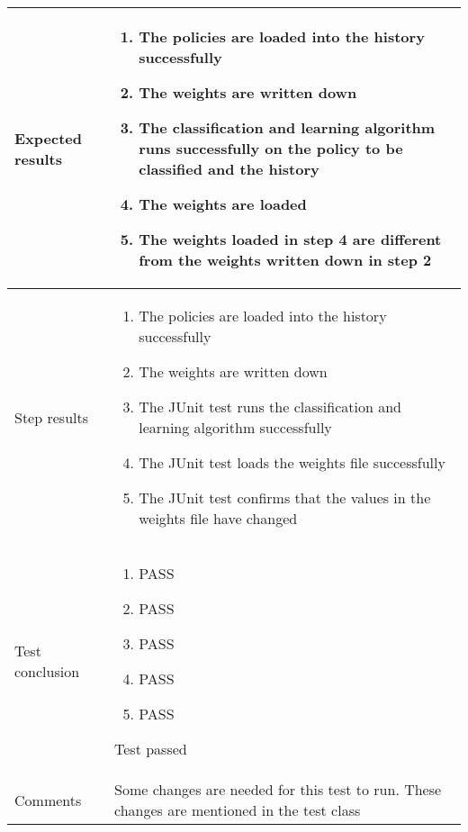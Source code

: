 \documentclass[10pt]{article}
\begin{document}
\begin{center}
\begin{longtable}{ | p{4cm} | p{10cm} | }
			Expected results &	\begin{enumerate}
							\item The policies are loaded into the history successfully
							\item The weights are written down
							\item The classification and learning algorithm runs successfully on the policy to be classified and the history
							\item The weights are loaded
							\item The weights loaded in step 4 are different from the weights written down in step 2
						\end{enumerate}
							 \\  [3pt] \hline

			Step results & 	\begin{enumerate}
							\item The policies are loaded into the history successfully
							\item The weights are written down
							\item The JUnit test runs the classification and learning algorithm successfully
							\item The JUnit test loads the weights file successfully
							\item The JUnit test confirms that the values in the weights file have changed
						\end{enumerate}
							 \\  [3pt] \hline

			Test conclusion & 	\begin{enumerate}
							\item PASS
							\item PASS
							\item PASS
							\item PASS
							\item PASS
						\end{enumerate}
						Test passed \\ [3pt] \hline
			Comments & Some changes are needed for this test to run. These changes are mentioned in the test class
				\\ [3pt] \hline
		\end{longtable}
	\end{center}
\end{document}
